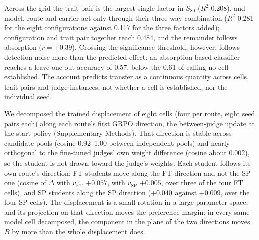 Across the grid the trait pair is the largest single factor in $S_{80}$ ($R^2$ 0.208), and model, route and carrier act only through their three-way combination ($R^2$ 0.281 for the eight configurations against 0.117 for the three factors added); configuration and trait pair together reach 0.484, and the remainder follows absorption ($r = +0.39$). Crossing the significance threshold, however, follows detection noise more than the predicted effect: an absorption-based classifier reaches a leave-one-out accuracy of 0.57, below the 0.61 of calling no cell established. The account predicts transfer as a continuous quantity across cells, trait pairs and judge instances, not whether a cell is established, nor the individual seed.


We decomposed the trained displacement of eight cells (four per route, eight seed pairs each) along each route's first GRPO direction, the between-judge update at the start policy (Supplementary Methods). That direction is stable across candidate pools (cosine 0.92--1.00 between independent pools) and nearly orthogonal to the fine-tuned judges' own weight difference (cosine about 0.002), so the student is not drawn toward the judge's weights. Each student follows its own route's direction: FT students move along the FT direction and not the SP one (cosine of $\Delta$ with $v_{\mathrm{FT}}$ $+0.057$, with $v_{\mathrm{SP}}$ $+0.005$, over three of the four FT cells), and SP students along the SP direction ($+0.040$ against $+0.009$, over the four SP cells). The displacement is a small rotation in a large parameter space, and its projection on that direction moves the preference margin: in every same-model cell decomposed, the component in the plane of the two directions moves $B$ by more than the whole displacement does.

